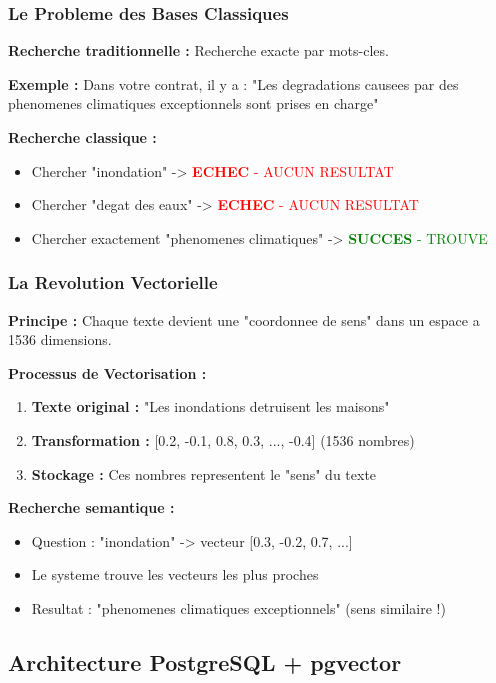 \documentclass[a4paper,12pt]{article}
\begin{document}
\subsubsection{Le Probleme des Bases Classiques}
\textbf{Recherche traditionnelle :} Recherche exacte par mots-cles.

\textbf{Exemple :} Dans votre contrat, il y a : "Les degradations causees par des phenomenes climatiques exceptionnels sont prises en charge"

\textbf{Recherche classique :}
\begin{itemize}
    \item Chercher "inondation" -> \textcolor{red}{\textbf{ECHEC} - AUCUN RESULTAT}
    \item Chercher "degat des eaux" -> \textcolor{red}{\textbf{ECHEC} - AUCUN RESULTAT}  
    \item Chercher exactement "phenomenes climatiques" -> \textcolor{green}{\textbf{SUCCES} - TROUVE}
\end{itemize}

\subsubsection{La Revolution Vectorielle}
\textbf{Principe :} Chaque texte devient une "coordonnee de sens" dans un espace a 1536 dimensions.

\textbf{Processus de Vectorisation :}
\begin{enumerate}
    \item \textbf{Texte original :} "Les inondations detruisent les maisons"
    \item \textbf{Transformation :} [0.2, -0.1, 0.8, 0.3, ..., -0.4] (1536 nombres)
    \item \textbf{Stockage :} Ces nombres representent le "sens" du texte
\end{enumerate}

\textbf{Recherche semantique :}
\begin{itemize}
    \item Question : "inondation" -> vecteur [0.3, -0.2, 0.7, ...]
    \item Le systeme trouve les vecteurs les plus proches
    \item Resultat : "phenomenes climatiques exceptionnels" (sens similaire !)
\end{itemize}

\subsection{Architecture PostgreSQL + pgvector}
\end{document}
